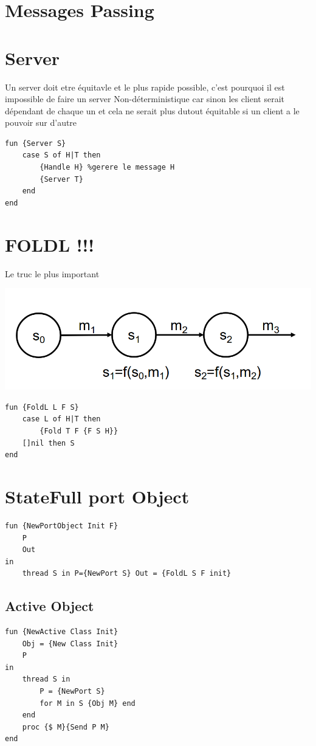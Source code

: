 \documentclass[a4paper,12pt]{scrartcl}
\begin{document}
\section{Messages Passing}
	\section{Server}
		Un server doit etre équitavle et le plus rapide possible, c'est pourquoi il est impossible de faire un server Non-déterministique car sinon les client serait dépendant de chaque un et cela ne serait plus dutout équitable si un client a le pouvoir sur d'autre
		\begin{lstlisting}[language=OZ]
fun {Server S}
	case S of H|T then
		{Handle H} %gerere le message H
		{Server T}
	end
end
		\end{lstlisting}	
	\section{FOLDL !!!}
		Le truc le plus important
		
		\begin{center}
			\includegraphics[scale=0.6]{img/fold.png}
		\end{center}
		\begin{lstlisting}[language=OZ]
fun {FoldL L F S}
	case L of H|T then
		{Fold T F {F S H}}
	[]nil then S
end
		\end{lstlisting}
	\section{StateFull port Object}
		\begin{lstlisting}[language=OZ]
fun {NewPortObject Init F}
	P 
	Out
in
	thread S in P={NewPort S} Out = {FoldL S F init}
		\end{lstlisting}
	\subsection{Active Object}
		\begin{lstlisting}[language=OZ]
fun {NewActive Class Init}
	Obj = {New Class Init}
	P
in
	thread S in
		P = {NewPort S}
		for M in S {Obj M} end
	end
	proc {$ M}{Send P M}
end
		\end{lstlisting}
		
\end{document}
